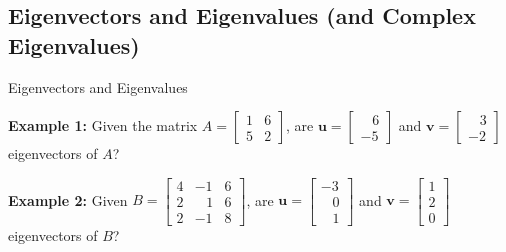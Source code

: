 \documentclass[10pt, aspectratio=169]{beamer}
\begin{document}
\subsection{Eigenvectors and Eigenvalues (and Complex Eigenvalues)}
\begin{frame}{Eigenvectors and Eigenvalues}
    \begin{center}\setlength{\fboxsep}{10pt}
    \end{center}

    \textbf{Example 1:}
    Given the matrix \(A = \begin{bmatrix} 1 & 6\\ 5 & 2 \end{bmatrix}\), are 
    \(\mathbf{u}=\begin{bmatrix} \;\;\;6\\-5 \end{bmatrix}\) and 
     \(\mathbf{v}=\begin{bmatrix} \;\;\;3\\-2 \end{bmatrix}\) eigenvectors of \(A\)?

    \textbf{Example 2:}
    Given  \(B = \begin{bmatrix}4 & -1 & 6\\ 2 & \;\;\; 1 & 6\\ 2 & -1 & 8\end{bmatrix}\), are 
    \(\mathbf{u}=\begin{bmatrix} -3 \\ \;\;\;0 \\ \;\;\;1\end{bmatrix}\) and 
     \(\mathbf{v}=\begin{bmatrix} 1 \\ 2\\0 \end{bmatrix}\) eigenvectors of \(B\)?
\end{frame}
\end{document}
